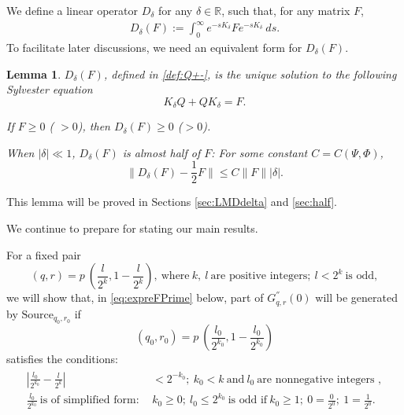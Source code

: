 \documentclass{article}
\numberwithin{equation}{section}
\newtheorem{lemma}[theorem]{Lemma}
\begin{document}
We define a linear operator $D_{\delta}$ for any $\delta\in \mathbb{R}$, such that, for any matrix $F$,
\begin{align}\label{def:Q+-}
  D_{\delta}(F):=\int_{0}^{\infty}e^{-s K_{\delta }}  F e^{-s K_{\delta }} \ ds.
\end{align}
To facilitate later discussions, we need an equivalent form for $D_{\delta}(F)$.
\begin{lemma}\label{LM:DdeltaM}
$D_{\delta}(F)$, defined in \eqref{def:Q+-}, is the unique solution to the following Sylvester equation
\begin{equation}\label{eqn:Q+-}
  K_{\delta}Q+QK_{\delta}=F.
\end{equation}

If $F\geq 0$ ( $>0$), then $D_{\delta}(F)\geq 0$ ($>0$). 

When $|\delta|\ll  1$, $D_{\delta}(F)$ is almost half of $F$: For some constant $C=C(\Psi,\Phi)$, 
\begin{equation}\label{eq:half}
  \|D_{\delta}(F)-\frac{1}{2}F\|\leq C \|F\|  |\delta|.
\end{equation}

\end{lemma}
This lemma will be proved in Sections \ref{sec:LMDdelta} and \ref{sec:half}.



We continue to prepare for stating our main results.

For a fixed pair
\begin{equation}\label{eq:fixPair}
(q, r) =p\ (  \frac{l}{2^k}, 1 - \frac{l}{2^k} ), \ \text{where}\ k,\ l\ \text{are positive integers}; \ l<2^k\ \text{is odd},
\end{equation} we will show that, in \eqref{eq:expreFPrime} below, part of
$G^{''}_{q, r}(0)$ will be generated by $\text{Source}_{q_0, r_0}$ if
\begin{equation}\label{eq:q0r0}
(q_0, r_0) = p\ (  \frac{l_0}{2^{k_0}}, 1 - \frac{l_0}{2^{k_0}} )
\end{equation}
satisfies the conditions:
\begin{align}\label{eq:closeness}
\begin{split}
\left| \frac{l_0}{2^{k_0}} - \frac{l}{2^k} \right| & < 2^{-k_0};\ k_0<k\  \text{and}\ l_0\ \text{are nonnegative integers },\\
\frac{l_0}{2^{k_0}}\ \text{is of simplified form}:\ & k_0\geq 0;\ l_0 \leq 2^{k_0} \ \text{is odd if} \ k_0\geq 1; \ 0=\frac{0}{2^0};\ 1=\frac{1}{2^0}.
\end{split}
\end{align}
\end{document}
